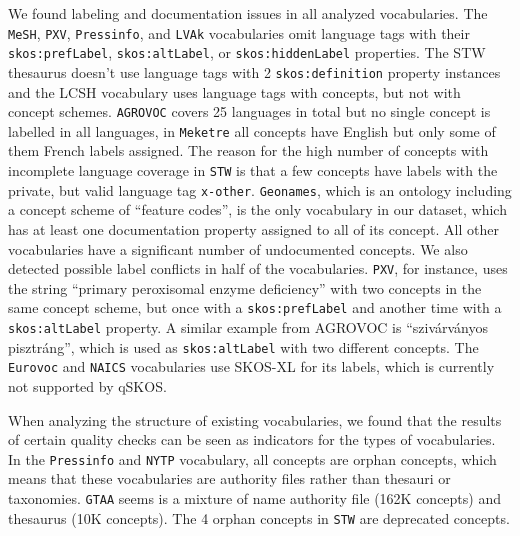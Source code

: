 We found labeling and documentation issues in all analyzed vocabularies. 
The \texttt{MeSH}, \texttt{PXV}, \texttt{Pressinfo}, and \texttt{LVAk} vocabularies omit language tags with their \texttt{skos:prefLabel}, \texttt{skos:altLabel}, or \texttt{skos:hiddenLabel} properties. The STW thesaurus doesn't use language tags with 2 \texttt{skos:definition} property instances and the LCSH vocabulary uses language tags with concepts, but not with concept schemes.
\texttt{AGROVOC} covers 25 languages in total but no single concept is labelled in all languages, in \texttt{Meketre} all concepts have English but only some of them French labels assigned. The reason for the high number of concepts with incomplete language coverage in \texttt{STW} is that a few concepts have labels with the private, but valid language tag \texttt{x-other}. 
\texttt{Geonames}, which is an ontology including a concept scheme of ``feature codes'', is the only vocabulary in our dataset, which has at least one documentation property assigned to all of its concept. All other vocabularies have a significant number of undocumented concepts.
We also detected possible label conflicts in half of the vocabularies. \texttt{PXV}, for instance, uses the string ``primary peroxisomal enzyme deficiency'' with two concepts in the same concept scheme, but once with a \texttt{skos:prefLabel} and another time with a \texttt{skos:altLabel} property. A similar example from AGROVOC is ``sziv\'{a}rv\'{a}nyos pisztr\'{a}ng'', which is used as \texttt{skos:altLabel} with two different concepts.
The \texttt{Eurovoc} and \texttt{NAICS} vocabularies use SKOS-XL for its labels, which is currently not supported by qSKOS.


When analyzing the structure of existing vocabularies, we found that the results of certain quality checks can be seen as indicators for the types of vocabularies.
In the \texttt{Pressinfo} and \texttt{NYTP} vocabulary, all concepts are orphan concepts, which means that these vocabularies are authority files rather than thesauri or taxonomies. \texttt{GTAA} seems is a mixture of name authority file (162K concepts) and thesaurus (10K concepts). The 4 orphan concepts in \texttt{STW} are deprecated concepts.


